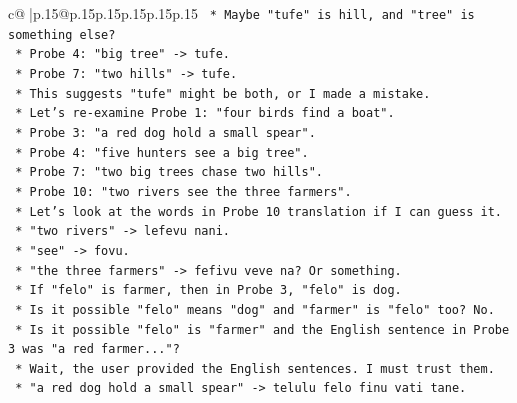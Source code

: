 \documentclass{article}
\begin{document}
{\begin{supertabular}{c@{$\;$}|p{.15\linewidth}@{}p{.15\linewidth}p{.15\linewidth}p{.15\linewidth}p{.15\linewidth}p{.15\linewidth}}
{{{\texttt{                                        *   Maybe "tufe" is hill, and "tree" is something else?} \\
\texttt{                                        *   Probe 4: "big tree" {-}> tufe.} \\
\texttt{                                        *   Probe 7: "two hills" {-}> tufe.} \\
\texttt{                                        *   This suggests "tufe" might be both, or I made a mistake.} \\
\texttt{                                        *   Let's re{-}examine Probe 1: "four birds find a boat".} \\
\texttt{                                        *   Probe 3: "a red dog hold a small spear".} \\
\texttt{                                        *   Probe 4: "five hunters see a big tree".} \\
\texttt{                                        *   Probe 7: "two big trees chase two hills".} \\
\texttt{                                        *   Probe 10: "two rivers see the three farmers".} \\
\texttt{                                        *   Let's look at the words in Probe 10 translation if I can guess it.} \\
\texttt{                                        *   "two rivers" {-}> lefevu nani.} \\
\texttt{                                        *   "see" {-}> fovu.} \\
\texttt{                                        *   "the three farmers" {-}> fefivu veve na? Or something.} \\
\texttt{                                        *   If "felo" is farmer, then in Probe 3, "felo" is dog.} \\
\texttt{                                        *   Is it possible "felo" means "dog" and "farmer" is "felo" too? No.} \\
\texttt{                                        *   Is it possible "felo" is "farmer" and the English sentence in Probe 3 was "a red farmer..."?} \\
\texttt{                                        *   Wait, the user provided the English sentences. I must trust them.} \\
\texttt{                                        *   "a red dog hold a small spear" {-}> telulu felo finu vati tane.} \\
}}}
\end{supertabular}}
\end{document}

